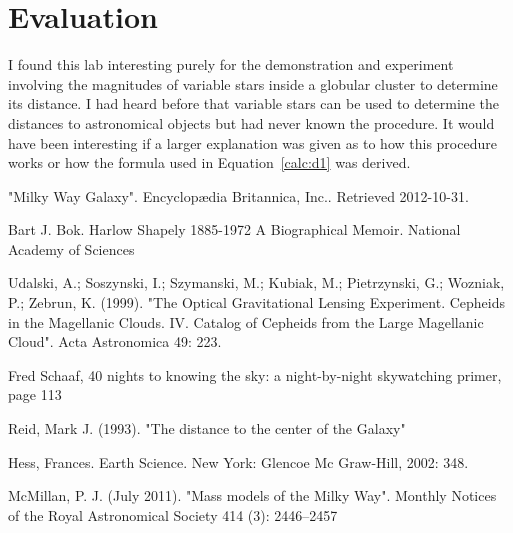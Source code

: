 \documentclass{article}
\begin{document}

\section{Evaluation}

I found this lab interesting purely for the demonstration and experiment involving
the magnitudes of variable stars inside a globular cluster to determine its distance.
I had heard before that variable stars can be used to determine the distances to
astronomical objects but had never known the procedure. It would have been interesting
if a larger explanation was given as to how this procedure works or how the formula
used in Equation~\ref{calc:d1} was derived.



\begin{thebibliography}{9}

"Milky Way Galaxy". Encyclopædia Britannica, Inc.. Retrieved 2012-10-31.

Bart J. Bok. Harlow Shapely 1885-1972 A Biographical Memoir. National Academy of Sciences

Udalski, A.; Soszynski, I.; Szymanski, M.; Kubiak, M.; Pietrzynski, G.; Wozniak, P.; Zebrun, K. (1999). "The Optical Gravitational Lensing Experiment. Cepheids in the Magellanic Clouds. IV. Catalog of Cepheids from the Large Magellanic Cloud". Acta Astronomica 49: 223.

Fred Schaaf, 40 nights to knowing the sky: a night-by-night skywatching primer, page 113

Reid, Mark J. (1993). "The distance to the center of the Galaxy"

Hess, Frances. Earth Science. New York: Glencoe Mc Graw-Hill, 2002: 348.

McMillan, P. J. (July 2011). "Mass models of the Milky Way". Monthly Notices of the Royal Astronomical Society 414 (3): 2446–2457

\end{thebibliography}
\end{document}
